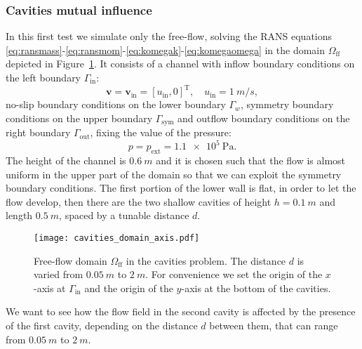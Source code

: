 \subsubsection{Cavities mutual influence}
In this first test we simulate only the free-flow, solving the RANS equations  \eqref{eq:ransmass}-\eqref{eq:ransmom}-\eqref{eq:komegak}-\eqref{eq:komegaomega} in the domain $\Omega_\text{ff}$ depicted in Figure~\ref{fig:singledomain}. It consists of a channel with inflow boundary 
conditions on the left boundary $\Gamma_\text{in}$:
\begin{equation}
	\mathbf{v} = \mathbf{v}_\text{in} = [u_\text{in}, 0]^\mathrm{T}, \quad u_\text{in} = \SI{1}{m/s},
\end{equation}
no-slip boundary conditions on the lower boundary $\Gamma_w$, symmetry boundary conditions on the upper boundary $\Gamma_\text{sym}$ and outflow boundary conditions on the right boundary $\Gamma_\text{out}$, fixing the value of the pressure:
\begin{equation}
	p = p_\text{ext} = \SI{1.1e5}{\pascal}.
\end{equation}
The height of the channel is $\SI{0.6}{m}$ and it is chosen such that the flow is almost uniform in the upper part of the domain so that we can exploit the symmetry boundary conditions. The first portion of the lower wall is flat, in order to let the flow develop, then there are the two shallow cavities of height $h=\SI{0.1}{m}$ and length $\SI{0.5}{m}$, spaced by a tunable distance $d$.
\begin{figure}[ht]
	\centering
	\texttt{[image: cavities\_domain\_axis.pdf]}
	\caption[Free-flow domain $\Omega_\text{ff}$ in the cavities problem]{Free-flow domain $\Omega_\text{ff}$ in the cavities problem. The distance $d$ is varied from $\SI{0.05}{m}$ to $\SI{2}{m}$. For convenience we set the origin of the $x$-axis at $\Gamma_\text{in}$ and the origin of the $y$-axis at the bottom of the cavities.}
	\label{fig:singledomain}
\end{figure}

We want to see how the flow field in the second cavity is affected by the 
presence of the first cavity, depending on the distance $d$ between them, that 
can range from $\SI{0.05}{m}$ to $\SI{2}{m}$.

